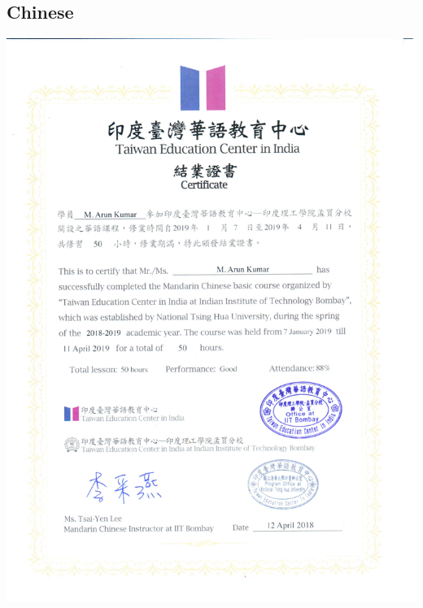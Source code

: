 \documentclass{article}
\begin{document}
	\subsection{Chinese}
		\includegraphics[page=1, scale=0.5]{proofs/chinese_2.pdf}
		\newpage
\end{document}
